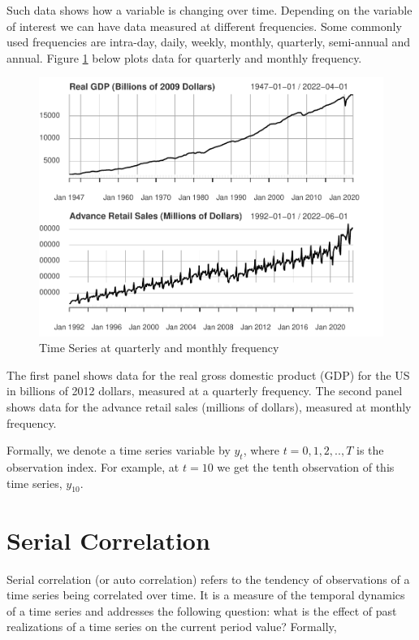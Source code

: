 \documentclass[]{book}
\theoremstyle{definition}
\theoremstyle{definition}
\theoremstyle{definition}
\theoremstyle{remark}
\begin{document}
Such data shows how a variable is changing over time. Depending on the
variable of interest we can have data measured at different frequencies.
Some commonly used frequencies are intra-day, daily, weekly, monthly,
quarterly, semi-annual and annual. Figure \ref{fig:ch1-figure1} below
plots data for quarterly and monthly frequency.

\begin{figure}

{\centering \includegraphics[width=0.8\linewidth]{bookdown-demo_files/figure-latex/ch1-figure1-1} 

}

\caption{Time Series at quarterly and monthly frequency}\label{fig:ch1-figure1}
\end{figure}

The first panel shows data for the real gross domestic product (GDP) for
the US in billions of 2012 dollars, measured at a quarterly frequency.
The second panel shows data for the advance retail sales (millions of
dollars), measured at monthly frequency.

Formally, we denote a time series variable by \(y_t\), where
\(t=0,1,2,..,T\) is the observation index. For example, at \(t=10\) we
get the tenth observation of this time series, \(y_{10}\).

\hypertarget{serial-correlation}{%
\section{Serial Correlation}\label{serial-correlation}}

Serial correlation (or auto correlation) refers to the tendency of
observations of a time series being correlated over time. It is a
measure of the temporal dynamics of a time series and addresses the
following question: what is the effect of past realizations of a time
series on the current period value? Formally,
\end{document}
